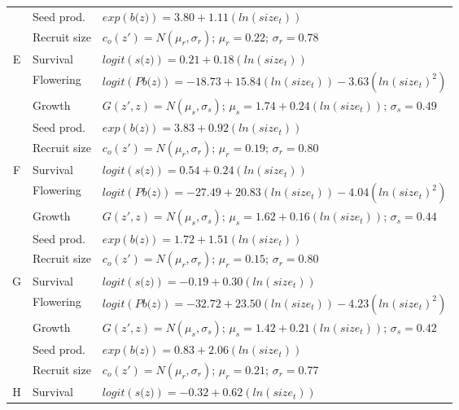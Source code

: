 \documentclass[12pt, letterpaper]{article}
\begin{document}
\begin{spacing}{1.3}
\begin{longtable}[ht!]{c|l|p{}}
         \rowcolor[gray]{.95}& Seed prod.  & $exp(\textit{b(z)}) = 3.80 + 1.11 (ln(size_t))$  \\
         & Recruit size  &  $c_o(z') = N(\mu_r, \sigma_r)$; $\mu_r = 0.22$; $\sigma_r = 0.78$ \\
         \hline
        \rowcolor[gray]{.95}E &   Survival  &   $logit(\textit{s(z)})= 0.21 +0.18(ln(size_t))$ \\
         & Flowering  & $logit(\textit{Pb(z)})  = -18.73 + 15.84(ln(size_t)) -3.63 (ln(size_t)^2)$ \\
         \rowcolor[gray]{.95}& Growth  &  $G(z',z) = N(\mu_s, \sigma_s)$; $\mu_s = 1.74 + 0.24(ln(size_t))$; $\sigma_s = 0.49$\\
         & Seed prod.  & $exp(\textit{b(z)}) = 3.83 + 0.92 (ln(size_t))$  \\
         \rowcolor[gray]{.95}& Recruit size  &  $c_o(z') = N(\mu_r, \sigma_r)$; $\mu_r = 0.19$; $\sigma_r = 0.80$ \\
         \hline
        F &  Survival  &   $logit(\textit{s(z)})= 0.54 +0.24(ln(size_t))$ \\
         \rowcolor[gray]{.95}& Flowering  & $logit(\textit{Pb(z)})  = -27.49 + 20.83(ln(size_t)) -4.04 (ln(size_t)^2)$ \\
         & Growth  &  $G(z',z) = N(\mu_s, \sigma_s)$; $\mu_s = 1.62 + 0.16(ln(size_t))$; $\sigma_s = 0.44$\\
         \rowcolor[gray]{.95}& Seed prod.  & $exp(\textit{b(z)}) = 1.72 + 1.51 (ln(size_t))$  \\
         & Recruit size  &  $c_o(z') = N(\mu_r, \sigma_r)$; $\mu_r = 0.15$; $\sigma_r = 0.80$ \\
         \hline
        \rowcolor[gray]{.95}G &  Survival  &  $logit(\textit{s(z)})= -0.19 +0.30(ln(size_t))$ \\
         & Flowering  & $logit(\textit{Pb(z)})  = -32.72 + 23.50(ln(size_t)) -4.23 (ln(size_t)^2)$ \\
         \rowcolor[gray]{.95}& Growth  &  $G(z',z) = N(\mu_s, \sigma_s)$; $\mu_s = 1.42 + 0.21(ln(size_t))$; $\sigma_s = 0.42$\\
         & Seed prod.  & $exp(\textit{b(z)}) = 0.83 + 2.06 (ln(size_t))$  \\
         \rowcolor[gray]{.95}& Recruit size  &  $c_o(z') = N(\mu_r, \sigma_r)$; $\mu_r = 0.21$; $\sigma_r = 0.77$ \\
         \hline
        H &  Survival  &  $logit(\textit{s(z)})= -0.32 +0.62(ln(size_t))$ \\

\end{longtable}
\end{spacing}
\end{document}
